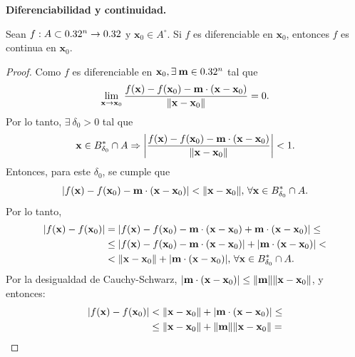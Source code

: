 \begin{theorem}\textbf{Diferenciabilidad y continuidad.} \label{teo:difCont}
\mbox{}

Sean $f: A \subset 0.32^n \to 0.32$ y $\mathbf{x}_0 \in  A^{\circ}$. Si $f$ es diferenciable en $\mathbf{x}_0$, entonces $f$ es continua en $\mathbf{x}_0$.
 \begin{proof}
 \mbox{}
 
 Como $f$ es diferenciable en $\mathbf{x}_0, \exists\:\mathbf{m} \in 0.32^n$ tal que
 \[
  \lim_{\mathbf{x} \to \mathbf{x}_0} \frac{f(\mathbf{x}) - f(\mathbf{x}_0) - \mathbf{m} \cdot (\mathbf{x} - \mathbf{x}_0)}{\norm{\mathbf{x} - \mathbf{x}_0}} = 0.
 \]
Por lo tanto, $\exists\:\delta_0 > 0$ tal que 
\[
 \mathbf{x} \in B_{\delta_0}^* \cap A \Rightarrow 
 \abs{ \frac{f(\mathbf{x}) - f(\mathbf{x}_0) - \mathbf{m} \cdot (\mathbf{x} - \mathbf{x}_0)}{\norm{\mathbf{x} - \mathbf{x}_0}} } < 1.
\]
Entonces, para este $\delta_0$, se cumple que
\[
 \abs{ f(\mathbf{x}) - f(\mathbf{x}_0) - \mathbf{m} \cdot (\mathbf{x} - \mathbf{x}_0) } < \norm{\mathbf{x} - \mathbf{x}_0}, \, \forall \mathbf{x} \in B_{\delta_0}^* \cap A.
\]
Por lo tanto,
\begin{align*}
\abs{ f(\mathbf{x}) - f(\mathbf{x}_0) } &=   \abs{ f(\mathbf{x}) - f(\mathbf{x}_0) - \mathbf{m} \cdot (\mathbf{x} - \mathbf{x}_0) + \mathbf{m} \cdot (\mathbf{x} - \mathbf{x}_0) } \le \\
                      &\le \abs{ f(\mathbf{x}) - f(\mathbf{x}_0) - \mathbf{m} \cdot (\mathbf{x} - \mathbf{x}_0) } + \abs{ \mathbf{m} \cdot (\mathbf{x} - \mathbf{x}_0) } < \\
                      &< \norm{\mathbf{x} - \mathbf{x}_0} + \abs{ \mathbf{m} \cdot (\mathbf{x} - \mathbf{x}_0) }, \, 
                      \forall \mathbf{x} \in B^*_{\delta_0} \cap A.
\end{align*}
Por la desigualdad de Cauchy-Schwarz, $\abs{ \mathbf{m} \cdot (\mathbf{x} - \mathbf{x}_0) } \le \norm{\mathbf{m}} \norm{\mathbf{x} - \mathbf{x}_0}$, y entonces:
\begin{align*}
\abs{ f(\mathbf{x}) - f(\mathbf{x}_0) } &< \norm{\mathbf{x} - \mathbf{x}_0} + \abs{ \mathbf{m} \cdot (\mathbf{x} - \mathbf{x}_0) } \le \\
                      &\le \norm{\mathbf{x} - \mathbf{x}_0} + \norm{\mathbf{m}} \norm{\mathbf{x} - \mathbf{x}_0} = \\

\end{align*}
\end{proof}
\end{theorem}

